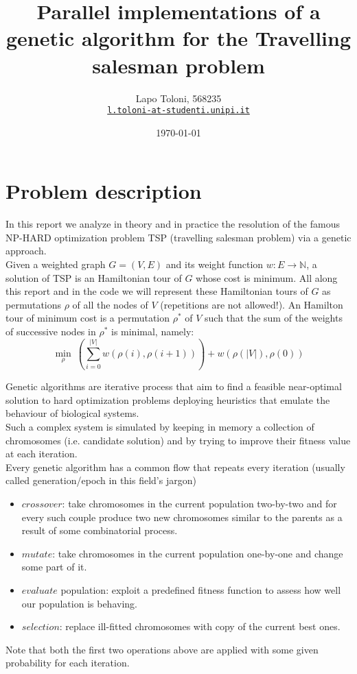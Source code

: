 \documentclass[11pt]{article}
\title{Parallel implementations of a genetic algorithm for the Travelling salesman problem}
\author{Lapo Toloni, 568235 \\%
    \href{l.toloni-at-studenti.unipi.it}{\texttt{l.toloni-at-studenti.unipi.it}}}
\date{\today}
\begin{document}
\maketitle

\section{Problem description} %
In this report we analyze in theory and in practice the resolution of the famous NP-HARD optimization problem TSP (travelling salesman problem) via a genetic approach.\\
Given a weighted graph $ G=(V,E) $ and its weight function $ w: E \longrightarrow \mathbb{N}$, a solution of TSP is an Hamiltonian tour of $ G $ whose cost is minimum. 
All along this report and in the code we will represent these Hamiltonian tours of $ G $ as permutations $ \rho $ of all the nodes of $ V $  (repetitions are not allowed!). An Hamilton tour of minimum cost is a permutation $ \rho^*$ of $ V $ such that the sum of the weights of successive nodes in $ \rho^* $ is minimal, namely:
\[ \min_{\rho}\ (\sum_{i=0}^{|V|} w(\rho(i),\rho(i+1))) + w(\rho(|V|), \rho(0))  \]

Genetic algorithms are iterative process that aim to find a feasible near-optimal solution to hard optimization problems deploying heuristics that emulate the behaviour of biological systems.\\
Such a complex system is simulated by keeping in memory a collection of chromosomes (i.e. candidate solution) and by trying to improve their fitness value at each iteration. \\
Every genetic algorithm has a common flow that repeats every iteration (usually called generation/epoch in this field's jargon)
\begin{itemize}
	\item $ crossover $: take chromosomes in the current population two-by-two and for every such couple produce two new chromosomes similar to the parents as a result of some combinatorial process.
	\item $ mutate $: take chromosomes in the current population one-by-one and change some part of it.
	\item $ evaluate $ population: exploit a predefined fitness function to assess how well our population is behaving.
	\item $ selection $: replace ill-fitted chromosomes with copy of the current best ones.
\end{itemize}
Note that both the first two operations above are applied with some given probability for each iteration.
\end{document}
